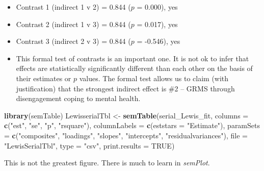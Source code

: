 \documentclass[
  11pt,
]{book}
\newenvironment{Shaded}{\begin{snugshade}}{\end{snugshade}}
\newcommand{\AttributeTok}[1]{\textcolor[rgb]{0.27,0.27,0.27}{#1}}
\newcommand{\ConstantTok}[1]{\textcolor[rgb]{0.37,0.37,0.37}{#1}}
\newcommand{\FunctionTok}[1]{\textcolor[rgb]{0.27,0.27,0.27}{\textbf{#1}}}
\newcommand{\NormalTok}[1]{#1}
\newcommand{\OtherTok}[1]{\textcolor[rgb]{0.37,0.37,0.37}{#1}}
\newcommand{\StringTok}[1]{\textcolor[rgb]{0.5,0.5,0.5}{#1}}
\providecommand{\tightlist}{%
  \setlength{\itemsep}{0pt}\setlength{\parskip}{0pt}}
\begin{document}
\begin{itemize}
  \begin{itemize}
  \tightlist
  \item
    Contrast 1 (indirect 1 v 2) = 0.844 (\(p\) = 0.000), yes
  \item
    Contrast 2 (indirect 1 v 3) = 0.844 (\(p\) = 0.017), yes
  \item
    Contrast 3 (indirect 2 v 3) = 0.844 (\(p\) = -0.546), yes
  \item
    This formal test of contrasts is an important one. It is not ok to infer that effects are statistically significantly different than each other on the basis of their estimates or \(p\) values. The formal test allows us to claim (with justification) that the strongest indirect effect is \#2 -- GRMS through disengagement coping to mental health.
  \end{itemize}
\end{itemize}

\begin{Shaded}
\begin{Highlighting}[]
\FunctionTok{library}\NormalTok{(semTable)}
\NormalTok{LewisserialTbl }\OtherTok{\textless{}{-}} \FunctionTok{semTable}\NormalTok{(serial\_Lewis\_fit, }\AttributeTok{columns =} \FunctionTok{c}\NormalTok{(}\StringTok{"est"}\NormalTok{, }\StringTok{"se"}\NormalTok{, }\StringTok{"p"}\NormalTok{, }\StringTok{"rsquare"}\NormalTok{),  }\AttributeTok{columnLabels =} \FunctionTok{c}\NormalTok{(}\AttributeTok{eststars =} \StringTok{"Estimate"}\NormalTok{), }\AttributeTok{paramSets =} \FunctionTok{c}\NormalTok{(}\StringTok{"composites"}\NormalTok{, }\StringTok{"loadings"}\NormalTok{, }\StringTok{"slopes"}\NormalTok{, }\StringTok{"intercepts"}\NormalTok{, }\StringTok{"residualvariances"}\NormalTok{), }\AttributeTok{file =} \StringTok{"LewisSerialTbl"}\NormalTok{, }\AttributeTok{type =} \StringTok{"csv"}\NormalTok{, }\AttributeTok{print.results =} \ConstantTok{TRUE}\NormalTok{)}
\end{Highlighting}
\end{Shaded}

This is not the greatest figure. There is much to learn in \emph{semPlot}.
\end{document}
